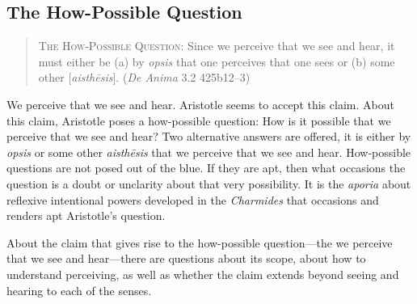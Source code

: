 
\subsection{The How-Possible Question} %
\label{sub:the_how_possible_question}

\begin{quote}
	\textsc{The How-Possible Question}: Since we perceive that we see and hear, it must either be (a) by \emph{opsis} that one perceives that one sees or (b) some other [\emph{aisthēsis}]. (\emph{De Anima} 3.2 425b12–3)
\end{quote}

We perceive that we see and hear. Aristotle seems to accept this claim. About this claim, Aristotle poses a how-possible question: How is it possible that we perceive that we see and hear? Two alternative answers are offered, it is either by \emph{opsis} or some other \emph{aisthēsis} that we perceive that we see and hear. How-possible questions are not posed out of the blue. If they are apt, then what occasions the question is a doubt or unclarity about that very possibility. It is the \emph{aporia} about reflexive intentional powers developed in the \emph{Charmides} that occasions and renders apt Aristotle's question.

About the claim that gives rise to the how-possible question—the we perceive that we see and hear—there are questions about its scope, about how to understand perceiving, as well as whether the claim extends beyond seeing and hearing to each of the senses.

